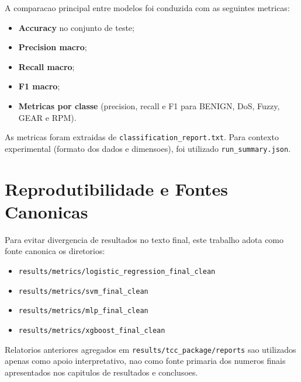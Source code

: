 A comparacao principal entre modelos foi conduzida com as seguintes metricas:

\begin{itemize}
  \item \textbf{Accuracy} no conjunto de teste;
  \item \textbf{Precision macro};
  \item \textbf{Recall macro};
  \item \textbf{F1 macro};
  \item \textbf{Metricas por classe} (precision, recall e F1 para BENIGN, DoS, Fuzzy, GEAR e RPM).
\end{itemize}

As metricas foram extraidas de \texttt{classification\_report.txt}. Para contexto experimental (formato dos dados e dimensoes), foi utilizado \texttt{run\_summary.json}.

\section{Reprodutibilidade e Fontes Canonicas}

Para evitar divergencia de resultados no texto final, este trabalho adota como fonte canonica os diretorios:

\begin{itemize}
  \item \texttt{results/metrics/logistic\_regression\_final\_clean}
  \item \texttt{results/metrics/svm\_final\_clean}
  \item \texttt{results/metrics/mlp\_final\_clean}
  \item \texttt{results/metrics/xgboost\_final\_clean}
\end{itemize}

Relatorios anteriores agregados em \texttt{results/tcc\_package/reports} sao utilizados apenas como apoio interpretativo, nao como fonte primaria dos numeros finais apresentados nos capitulos de resultados e conclusoes.















